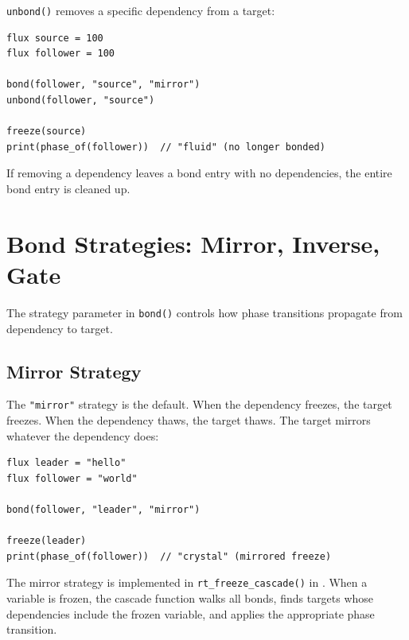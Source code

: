 \lstinline|unbond()| removes a specific dependency from a target:

\begin{lstlisting}[language=Lattice, caption={Removing a bond}]
flux source = 100
flux follower = 100

bond(follower, "source", "mirror")
unbond(follower, "source")

freeze(source)
print(phase_of(follower))  // "fluid" (no longer bonded)
\end{lstlisting}

If removing a dependency leaves a bond entry with no dependencies, the entire bond entry is cleaned up.


\section{Bond Strategies: Mirror, Inverse, Gate}\label{sec:bond-strategies}


The strategy parameter in \lstinline|bond()| controls how phase transitions propagate from dependency to target.

\subsection{Mirror Strategy}


The \lstinline|"mirror"| strategy is the default.
When the dependency freezes, the target freezes.
When the dependency thaws, the target thaws.
The target mirrors whatever the dependency does:

\begin{lstlisting}[language=Lattice, caption={Mirror bond strategy}]
flux leader = "hello"
flux follower = "world"

bond(follower, "leader", "mirror")

freeze(leader)
print(phase_of(follower))  // "crystal" (mirrored freeze)
\end{lstlisting}

The mirror strategy is implemented in \lstinline|rt_freeze_cascade()| in .
When a variable is frozen, the cascade function walks all bonds, finds targets whose dependencies include the frozen variable, and applies the appropriate phase transition.

